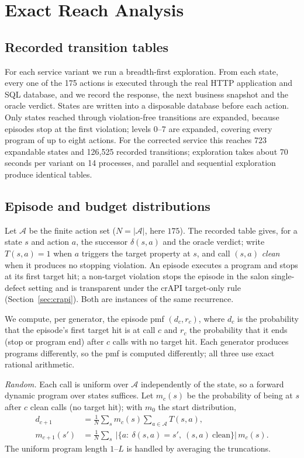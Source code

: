 \documentclass[conference]{IEEEtran}
\begin{document}
\section{Exact Reach Analysis}
\subsection{Recorded transition tables}
For each service variant we run a breadth-first exploration. From each state, every one
of the 175 actions is executed through the real HTTP application and SQL database, and we
record the response, the next business snapshot and the oracle verdict. States are written
into a disposable database before each action. Only states reached through violation-free
transitions are expanded, because episodes stop at the first violation; levels 0--7 are
expanded, covering every program of up to eight actions. For the corrected service this
reaches 723 expandable states and 126{,}525 recorded transitions; exploration takes about
70 seconds per variant on 14 processes, and parallel and sequential exploration produce
identical tables.

\subsection{Episode and budget distributions}
\label{sec:dp}
Let $\mathcal{A}$ be the finite action set ($N=|\mathcal{A}|$, here $175$). The recorded
table gives, for a state $s$ and action $a$, the successor $\delta(s,a)$ and the oracle
verdict; write $T(s,a)=1$ when $a$ triggers the target property at $s$, and call $(s,a)$
\emph{clean} when it produces no stopping violation. An episode executes a program and
stops at its first target hit; a non-target violation stops the episode in the salon
single-defect setting and is transparent under the crAPI target-only rule
(Section~\ref{sec:crapi}). Both are instances of the same recurrence.

We compute, per generator, the episode pmf $(d_c, r_c)$, where $d_c$ is the probability
that the episode's first target hit is at call $c$ and $r_c$ the probability that it ends
(stop or program end) after $c$ calls with no target hit. Each generator produces programs
differently, so the pmf is computed differently; all three use exact rational arithmetic.

\emph{Random.} Each call is uniform over $\mathcal{A}$ independently of the state, so a
forward dynamic program over states suffices. Let $m_c(s)$ be the probability of being at
$s$ after $c$ clean calls (no target hit); with $m_0$ the start distribution,
\begin{align}
d_{c+1} &= \tfrac{1}{N}\sum_{s} m_c(s)\!\!\sum_{a\in\mathcal{A}}\! T(s,a), \label{eq:detect}\\
m_{c+1}(s') &= \tfrac{1}{N}\sum_{s}\ \bigl|\{a:\ \delta(s,a)=s',\ (s,a)\ \text{clean}\}\bigr|\, m_c(s). \label{eq:carry}
\end{align}
The uniform program length $1$--$L$ is handled by averaging the truncations.
\end{document}
